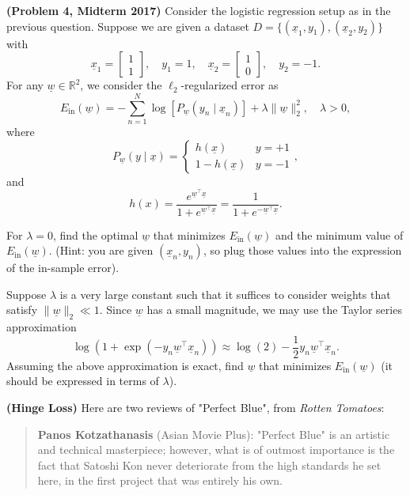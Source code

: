 \documentclass{article}
\theoremstyle{definition}
\begin{document}
\begin{question}
	\item \textbf{(Problem 4, Midterm 2017)} Consider the logistic regression setup as in the previous question. Suppose we are given a dataset $D = \{(\underline{x}_1, y_1), (\underline{x}_2, y_2)\}$ with
	\[
	\underline{x}_1 = \begin{bmatrix} 1 \\ 1 \end{bmatrix}, \quad y_1 = 1, \quad \underline{x}_2 = \begin{bmatrix} 1 \\ 0 \end{bmatrix}, \quad y_2 = -1.
	\]
	For any $\underline{w} \in \mathbb{R}^2$, we consider the $\ell_2$-regularized error as
	\[
	E_{\text{in}}(\underline{w}) = -\sum_{n=1}^N \log \left[ P_{\underline{w}}(y_n \mid \underline{x}_n) \right] + \lambda \|\underline{w}\|_2^2, \quad \lambda > 0,
	\]
	where
	\[
	P_{\underline{w}}(y \mid \underline{x}) = \begin{cases}
		h(\underline{x}) & y = +1 \\
		1 - h(\underline{x}) & y = -1
	\end{cases},
	\]
	and
	\[
	h(x) = \frac{e^{\underline{w}^\top \underline{x}}}{1 + e^{\underline{w}^\top \underline{x}}} = \frac{1}{1 + e^{-\underline{w}^\top \underline{x}}}.
	\]
	\begin{question}
		\item For $\lambda = 0$, find the optimal $\underline{w}$ that minimizes $E_{\text{in}}(\underline{w})$ and the minimum value of $E_{\text{in}}(\underline{w})$. (Hint: you are given $(\underline{x}_n, y_n)$, so plug those values into the expression of the in-sample error).
		
		\item Suppose $\lambda$ is a very large constant such that it suffices to consider weights that satisfy $\|\underline{w}\|_2 \ll 1$. Since $\underline{w}$ has a small magnitude, we may use the Taylor series approximation
		\[
		\log(1 + \exp(-y_n \underline{w}^\top \underline{x}_n)) \approx \log(2) - \frac{1}{2} y_n \underline{w}^\top \underline{x}_n.
		\]
		Assuming the above approximation is exact, find $\underline{w}$ that minimizes $E_{\text{in}}(\underline{w})$ (it should be expressed in terms of $\lambda$).
	\end{question}
	\item \textbf{(Hinge Loss)} Here are two reviews of "Perfect Blue", from \textit{Rotten Tomatoes}:
	\begin{quote}
		\textbf{Panos Kotzathanasis} (Asian Movie Plus): "Perfect Blue" is an artistic and technical masterpiece; however, what is of outmost importance is the fact that Satoshi Kon never deteriorate from the high standards he set here, in the first project that was entirely his own.\\
		

\end{quote}
\end{question}
\end{document}
